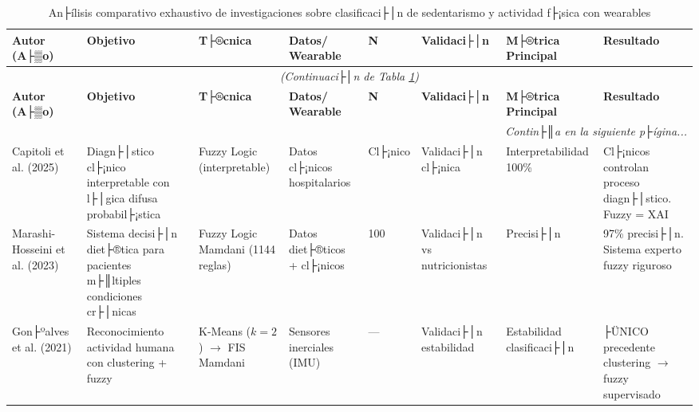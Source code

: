 \begin{landscape}
\footnotesize
\begin{longtable}{@{}p{1.8cm}p{2.5cm}p{1.8cm}p{1.5cm}p{0.9cm}p{1.3cm}p{2.0cm}p{1.8cm}@{}}
\caption{An├ílisis comparativo exhaustivo de investigaciones sobre clasificaci├│n de sedentarismo y actividad f├¡sica con wearables}
\label{tab:comparativa_investigaciones_completa} \\
\toprule
\textbf{Autor (A├▒o)} & 
\textbf{Objetivo} & 
\textbf{T├®cnica} & 
\textbf{Datos/ Wearable} & 
\textbf{N} & 
\textbf{Validaci├│n} & 
\textbf{M├®trica Principal} & 
\textbf{Resultado} \\
\midrule
\endfirsthead

\multicolumn{8}{c}{\textit{(Continuaci├│n de Tabla \ref{tab:comparativa_investigaciones_completa})}} \\
\toprule
\textbf{Autor (A├▒o)} & 
\textbf{Objetivo} & 
\textbf{T├®cnica} & 
\textbf{Datos/ Wearable} & 
\textbf{N} & 
\textbf{Validaci├│n} & 
\textbf{M├®trica Principal} & 
\textbf{Resultado} \\
\midrule
\endhead

\midrule
\multicolumn{8}{r}{\textit{Contin├║a en la siguiente p├ígina...}} \\
\endfoot

\bottomrule
\endlastfoot


Capitoli et al. (2025) \cite{Capitoli2025FuzzyXAI} & 
Diagn├│stico cl├¡nico interpretable con l├│gica difusa probabil├¡stica & 
Fuzzy Logic (interpretable) & 
Datos cl├¡nicos hospitalarios & 
Cl├¡nico & 
Validaci├│n cl├¡nica & 
Interpretabilidad 100\% & 
Cl├¡nicos controlan proceso diagn├│stico. Fuzzy = XAI \\

\midrule

Marashi-Hosseini et al. (2023) \cite{MarashiHosseini2023Dietary} & 
Sistema decisi├│n diet├®tica para pacientes m├║ltiples condiciones cr├│nicas & 
Fuzzy Logic Mamdani (1144 reglas) & 
Datos diet├®ticos + cl├¡nicos & 
100 & 
Validaci├│n vs nutricionistas & 
Precisi├│n & 
97\% precisi├│n. Sistema experto fuzzy riguroso \\

\midrule

Gon├ºalves et al. (2021) \cite{Goncalves2021} & 
Reconocimiento actividad humana con clustering + fuzzy & 
K-Means ($k=2$) $\rightarrow$ FIS Mamdani & 
Sensores inerciales (IMU) & 
--- & 
Validaci├│n estabilidad & 
Estabilidad clasificaci├│n & 
├ÜNICO precedente clustering $\rightarrow$ fuzzy supervisado \\


\end{longtable}
\end{landscape}
